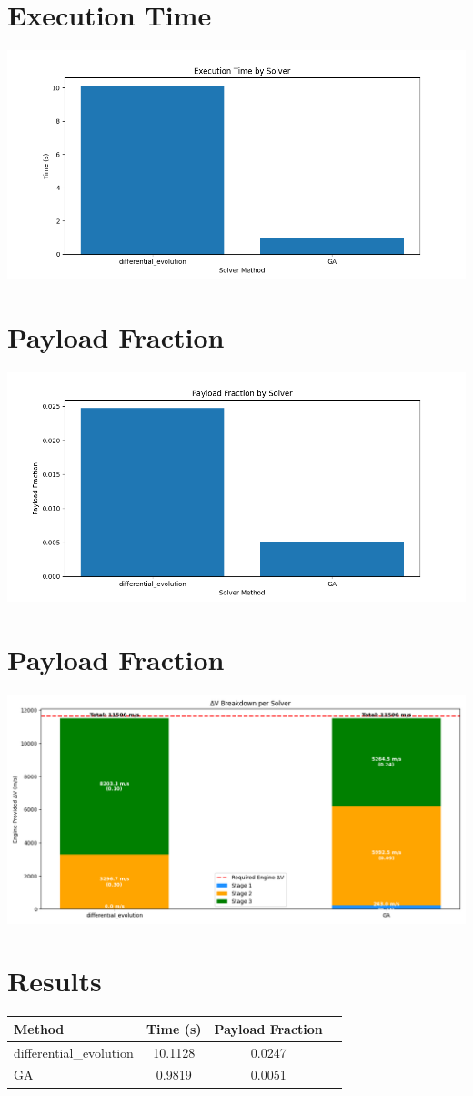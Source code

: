 \documentclass{article}
\begin{document}
\section{Execution Time}
\includegraphics[width=\textwidth]{execution_time.png}

\section{Payload Fraction}
\includegraphics[width=\textwidth]{payload_fraction.png}
                
\section{Payload Fraction}
\includegraphics[width=\textwidth]{dv_breakdown.png}

\section{Results}
\begin{tabular}{lccc}
\hline
Method & Time (s) & Payload Fraction \\
\hline
differential_evolution & 10.1128 & 0.0247 \\
GA & 0.9819 & 0.0051 \\

\hline
\end{tabular}
\end{document}
